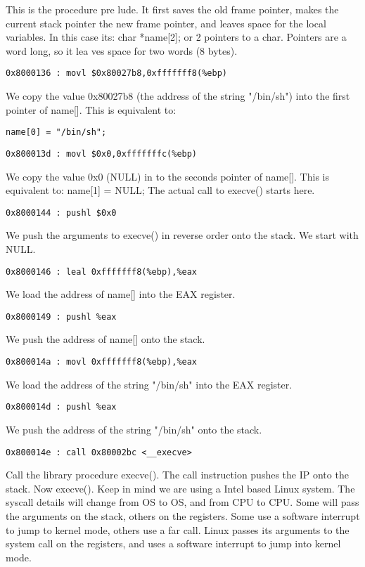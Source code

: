 \documentclass[10pt]{article}
\begin{document}
{This is the procedure pre lude. It first saves the old frame pointer, makes the current stack pointer the new frame 
pointer, and leaves space for the local variables. In this case its: char *name[2]; or 2 pointers to a char. Pointers 
are a word long, so it lea ves space for two words (8 bytes).

\begin{verbatim}
0x8000136 : movl $0x80027b8,0xfffffff8(%ebp)
\end{verbatim}

We copy the value 0x80027b8 (the address of the string "/bin/sh") into the first pointer of name[]. This is 
equivalent to: 

\begin{verbatim}
name[0] = "/bin/sh";
\end{verbatim}

\begin{verbatim}
0x800013d : movl $0x0,0xfffffffc(%ebp)
\end{verbatim}

We copy the value 0x0 (NULL) in to the seconds pointer of name[].  This is equivalent to: name[1] = NULL; 
The actual call to execve() starts here.

\begin{verbatim}
0x8000144 : pushl $0x0
\end{verbatim}

We push the arguments to execve() in reverse order onto the stack. We start with NULL.

\begin{verbatim}
0x8000146 : leal 0xfffffff8(%ebp),%eax
\end{verbatim}

We load the address of name[] into the EAX register.
\begin{verbatim}
0x8000149 : pushl %eax 
\end{verbatim}
We push the address of name[]  onto the stack.
\begin{verbatim}
0x800014a : movl 0xfffffff8(%ebp),%eax
\end{verbatim}
We load the address of the string "/bin/sh" into the EAX register.
\begin{verbatim}
0x800014d : pushl %eax 
\end{verbatim}
We push the address of the string "/bin/sh" onto the stack.
\begin{verbatim}
0x800014e : call 0x80002bc <__execve>
\end{verbatim}
Call the library procedure execve(). The call instruction pushes the IP onto the stack.
Now execve(). Keep in mind we are using a Intel based Linux system. The syscall details will change from OS 
to OS, and from CPU to CPU. Some will pass the arguments on the stack, others on the registers. Some use a 
software interrupt to jump to kernel mode, others use a far call. Linux passes its arguments to the system call on 
the registers, and uses a software interrupt to jump into kernel mode.

}
\end{document}

